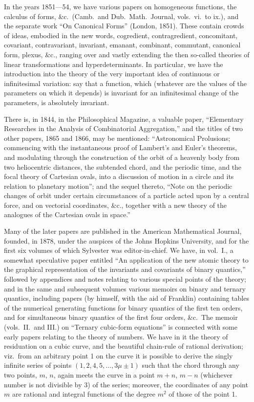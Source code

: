 \documentclass[11pt,a4paper]{article}
\begin{document}
In the years 1851---54, we have various papers on homogeneous functions, the calculus of forms, \&c.\ (Camb.\ and Dub.\ Math.\ Journal, vols.\ vi.\ to ix.), and the separate work ``On Canonical Forms'' (London, 1851). These contain crowds of ideas, embodied in the new words, cogredient, contragredient, concomitant, covariant, contravariant, invariant, emanant, combinant, commutant, canonical form, plexus, \&c., ranging over and vastly extending the then so-called theories of linear transformations and hyperdeterminants. In particular, we have the introduction into the theory of the very important idea of continuous or infinitesimal variation: say that a function, which (whatever are the values of the parameters on which it depends) is invariant for an infinitesimal change of the parameters, is absolutely invariant.

There is, in 1844, in the Philosophical Magazine, a valuable paper, ``Elementary Researches in the Analysis of Combinatorial Aggregation,'' and the titles of two other papers, 1865 and 1866, may be mentioned: ``Astronomical Prolusions; commencing with the instantaneous proof of Lambert's and Euler's theorems, and modulating through the construction of the orbit of a heavenly body from two heliocentric distances, the subtended chord, and the periodic time, and the focal theory of Cartesian ovals, into a discussion of motion in a circle and its relation to planetary motion''; and the sequel thereto, ``Note on the periodic changes of orbit under certain circumstances of a particle acted upon by a central force, and on vectorial coordinates, \&c., together with a new theory of the analogues of the Cartesian ovals in space.''

Many of the later papers are published in the American Mathematical Journal, founded, in 1878, under the auspices of the Johns Hopkins University, and for the first six volumes of which Sylvester was editor-in-chief. We have, in vol.\ I., a somewhat speculative paper entitled ``An application of the new atomic theory to the graphical representation of the invariants and covariants of binary quantics,'' followed by appendices and notes relating to various special points of the theory; and in the same and subsequent volumes various memoirs on binary and ternary quantics, including papers (by himself, with the aid of Franklin) containing tables of the numerical generating functions for binary quantics of the first ten orders, and for simultaneous binary quantics of the first four orders, \&c.\ The memoir (vols.\ II.\ and III.) on ``Ternary cubic-form equations'' is connected with some early papers relating to the theory of numbers. We have in it the theory of residuation on a cubic curve, and the beautiful chain-rule of rational derivation; viz.\ from an arbitrary point 1 on the curve it is possible to derive the singly infinite series of points $(1, 2, 4, 5, \ldots, 3\mu \pm 1)$ such that the chord through any two points, $m$, $n$, again meets the curve in a point $m + n$, $m - n$ (whichever number is not divisible by 3) of the series; moreover, the coordinates of any point $m$ are rational and integral functions of the degree $m^2$ of those of the point 1.
\end{document}
